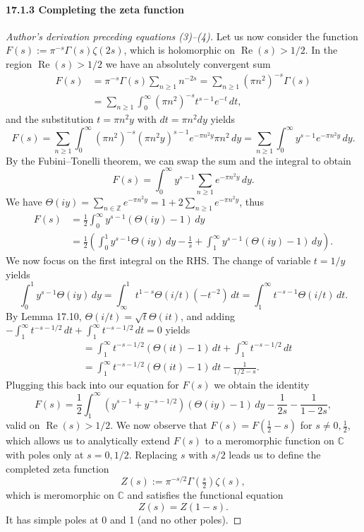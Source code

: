 \documentclass[UTF8,11pt]{ctexart}
\theoremstyle{definition}
\newcommand{\C}{\mathbb C}
\newcommand{\Z}{\mathbb Z}
\begin{document}
\paragraph{17.1.3 Completing the zeta function}
\begin{proof}[Author's derivation preceding equations (3)--(4)]
Let us now consider the function $F(s):=\pi^{-s}\Gamma(s)\zeta(2s)$, which is holomorphic on $\operatorname{Re}(s)>1/2$. In the region $\operatorname{Re}(s)>1/2$ we have an absolutely convergent sum
\begin{align*}
F(s)&=\pi^{-s}\Gamma(s)\sum_{n\geq1}n^{-2s}
=\sum_{n\geq1}(\pi n^2)^{-s}\Gamma(s)\\
&=\sum_{n\geq1}\int_0^\infty(\pi n^2)^{-s}t^{s-1}e^{-t}\,dt,
\end{align*}
and the substitution $t=\pi n^2y$ with $dt=\pi n^2dy$ yields
\[
F(s)=\sum_{n\geq1}\int_0^\infty(\pi n^2)^{-s}(\pi n^2y)^{s-1}e^{-\pi n^2y}\pi n^2\,dy
=\sum_{n\geq1}\int_0^\infty y^{s-1}e^{-\pi n^2y}\,dy.
\]
By the Fubini--Tonelli theorem, we can swap the sum and the integral to obtain
\[
F(s)=\int_0^\infty y^{s-1}\sum_{n\geq1}e^{-\pi n^2y}\,dy.
\]
We have $\Theta(iy)=\sum_{n\in\Z}e^{-\pi n^2y}=1+2\sum_{n\geq1}e^{-\pi n^2y}$, thus
\begin{align*}
F(s)&=\frac12\int_0^\infty y^{s-1}(\Theta(iy)-1)\,dy\\
&=\frac12\left(\int_0^1y^{s-1}\Theta(iy)\,dy-\frac1s+\int_1^\infty y^{s-1}(\Theta(iy)-1)\,dy\right).
\end{align*}
We now focus on the first integral on the RHS. The change of variable $t=1/y$ yields
\[
\int_0^1y^{s-1}\Theta(iy)\,dy
=\int_\infty^1 t^{1-s}\Theta(i/t)(-t^{-2})\,dt
=\int_1^\infty t^{-s-1}\Theta(i/t)\,dt.
\]
By Lemma 17.10, $\Theta(i/t)=\sqrt t\Theta(it)$, and adding $-\int_1^\infty t^{-s-1/2}\,dt+\int_1^\infty t^{-s-1/2}\,dt=0$ yields
\begin{align*}
&=\int_1^\infty t^{-s-1/2}(\Theta(it)-1)\,dt+\int_1^\infty t^{-s-1/2}\,dt\\
&=\int_1^\infty t^{-s-1/2}(\Theta(it)-1)\,dt-\frac1{1/2-s}.
\end{align*}
Plugging this back into our equation for $F(s)$ we obtain the identity
\[
F(s)=\frac12\int_1^\infty(y^{s-1}+y^{-s-1/2})(\Theta(iy)-1)\,dy-\frac1{2s}-\frac1{1-2s},
\]
valid on $\operatorname{Re}(s)>1/2$. We now observe that $F(s)=F(\frac12-s)$ for $s\ne0,\frac12$, which allows us to analytically extend $F(s)$ to a meromorphic function on $\C$ with poles only at $s=0,1/2$. Replacing $s$ with $s/2$ leads us to define the completed zeta function
\[
Z(s):=\pi^{-s/2}\Gamma(\tfrac s2)\zeta(s),\tag{3}
\]
which is meromorphic on $\C$ and satisfies the functional equation
\[
Z(s)=Z(1-s).\tag{4}
\]
It has simple poles at 0 and 1 (and no other poles).
\end{proof}
\end{document}
